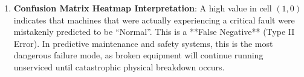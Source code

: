 \begin{enumerate}
    \item \textbf{Confusion Matrix Heatmap Interpretation}:
    A high value in cell $(1, 0)$ indicates that machines that were actually experiencing a critical fault were mistakenly predicted to be ``Normal''. 
    This is a **False Negative** (Type II Error). In predictive maintenance and safety systems, this is the most dangerous failure mode, as broken equipment will continue running unserviced until catastrophic physical breakdown occurs.
\end{enumerate}
